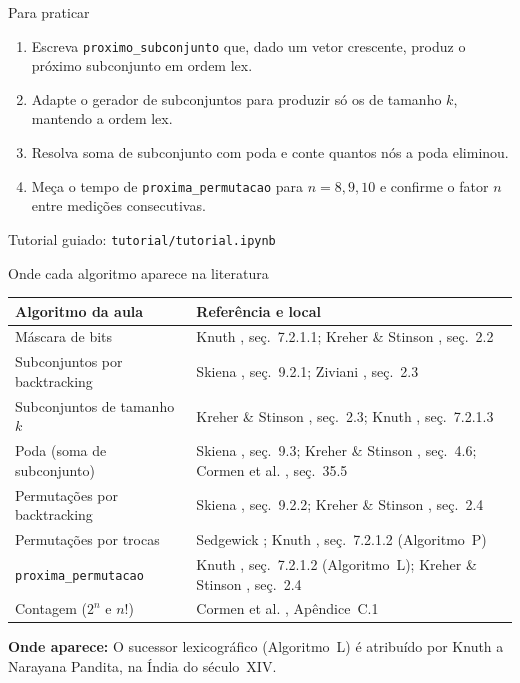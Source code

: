 \documentclass[aspectratio=169]{beamer}
\newcommand{\fonte}[1]{%
  \par\vspace{1pt}%
  {\tiny\color{gray!30!black}\textbf{Onde aparece:} #1\par}}
\begin{document}
\begin{frame}{Para praticar}
  \begin{enumerate}
    \item Escreva \texttt{proximo\_subconjunto} que, dado um vetor crescente, produz o próximo subconjunto em ordem lex.
    \item Adapte o gerador de subconjuntos para produzir só os de tamanho $k$, mantendo a ordem lex.
    \item Resolva soma de subconjunto com poda e conte quantos nós a poda eliminou.
    \item Meça o tempo de \texttt{proxima\_permutacao} para $n = 8,9,10$ e confirme o fator $n$ entre medições consecutivas.
  \end{enumerate}
  \begin{center}
    Tutorial guiado: \texttt{tutorial/tutorial.ipynb}
  \end{center}
\end{frame}

\begin{frame}{Onde cada algoritmo aparece na literatura}
  \begin{center}
  \scriptsize
  \begin{tabular}{@{}p{4.0cm}p{7.2cm}@{}}
    \toprule
    \textbf{Algoritmo da aula} & \textbf{Referência e local} \\
    \midrule
    Máscara de bits &
      Knuth \cite{knuth2011taocp4a}, seç.~7.2.1.1;
      Kreher \& Stinson \cite{kreher1999combinatorial}, seç.~2.2 \\
    Subconjuntos por backtracking &
      Skiena \cite{skiena2020algorithm}, seç.~9.2.1;
      Ziviani \cite{ziviani2011projeto}, seç.~2.3 \\
    Subconjuntos de tamanho $k$ &
      Kreher \& Stinson \cite{kreher1999combinatorial}, seç.~2.3;
      Knuth \cite{knuth2011taocp4a}, seç.~7.2.1.3 \\
    Poda (soma de subconjunto) &
      Skiena \cite{skiena2020algorithm}, seç.~9.3;
      Kreher \& Stinson \cite{kreher1999combinatorial}, seç.~4.6;
      Cormen et al. \cite{cormen2012algoritmos}, seç.~35.5 \\
    Permutações por backtracking &
      Skiena \cite{skiena2020algorithm}, seç.~9.2.2;
      Kreher \& Stinson \cite{kreher1999combinatorial}, seç.~2.4 \\
    Permutações por trocas &
      Sedgewick \cite{sedgewick1977permutation};
      Knuth \cite{knuth2011taocp4a}, seç.~7.2.1.2 (Algoritmo~P) \\
    \texttt{proxima\_permutacao} &
      Knuth \cite{knuth2011taocp4a}, seç.~7.2.1.2 (Algoritmo~L);
      Kreher \& Stinson \cite{kreher1999combinatorial}, seç.~2.4 \\
    Contagem ($2^n$ e $n!$) &
      Cormen et al. \cite{cormen2012algoritmos}, Apêndice~C.1 \\
    \bottomrule
  \end{tabular}
  \end{center}
  \fonte{O sucessor lexicográfico (Algoritmo~L) é atribuído por Knuth a
    Narayana Pandita, na Índia do século~XIV.}
\end{frame}
\end{document}
